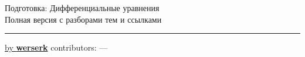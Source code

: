 \documentclass[11pt,a4paper]{article}
\newcommand{\topicsBase}{cheatsheets/math/differential-equations/preparation/topics}
\begin{document}
\begin{center}
  {\Huge Подготовка: Дифференциальные уравнения}\\[0.4cm]
  {\large Полная версия с разборами тем и ссылками}\\[0.2cm]
  \rule{\textwidth}{0.6pt}
\end{center}



% 
% 

\providecommand{\contributors}{}
\newcommand{\contributorsDisplay}{%
  \if\relax\detokenize{\contributors}\relax
    ---
  \else
    \texttt{\contributors}
  \fi}

{\noindent \href{https://werserk.com}{\textcolor{accent}{by \textbf{werserk}}} \hfill contributors: \contributorsDisplay}
\end{document}
